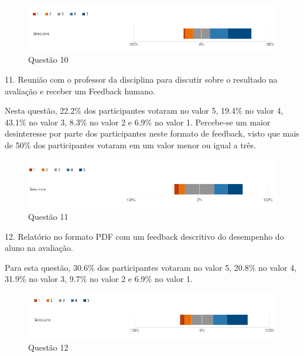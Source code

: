 \begin{figure}[H]
\centering
\includegraphics[scale=0.6]{figuras/10.png}
\caption{Questão 10}
\end{figure}

11. Reunião com o professor da disciplina para discutir sobre o resultado na avaliação e receber um Feedback humano.

Nesta questão, 22.2\% dos participantes votaram no valor 5, 19.4\% no valor 4, 43.1\% no valor 3, 8.3\% no valor 2 e 6.9\% no valor 1. Percebe-se um maior desinteresse por parte dos participantes neste formato de feedback, visto que mais de 50\% dos participantes votaram em um valor menor ou igual a três.

\begin{figure}[H]
\centering
\includegraphics[scale=0.6]{figuras/11.png}
\caption{Questão 11}
\end{figure}

12. Relatório no formato PDF com um feedback descritivo do desempenho do aluno na avaliação. 

Para esta questão, 30.6\% dos participantes votaram no valor 5, 20.8\% no valor 4, 31.9\% no valor 3, 9.7\% no valor 2 e 6.9\% no valor 1. 

\begin{figure}[H]
\centering
\includegraphics[scale=0.6]{figuras/12.png}
\caption{Questão 12}
\end{figure}
